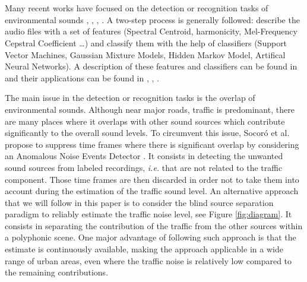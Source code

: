 \documentclass[twocolumn]{svjour3}          %
\providecommand{\DIFaddtex}[1]{{\protect\color{blue}\uwave{#1}}} %
\providecommand{\DIFaddend}{} %
\providecommand{\DIFadd}[1]{\texorpdfstring{\DIFaddtex{#1}}{#1}} %
\begin{document}
\section{\DIFadd{Related works}}
\DIFaddend Many recent works have focused on the detection or recognition tasks of environmental sounds \cite{heittola_sound_2011}, \cite{defreville_automatic_2006}, \cite{dufaux_automatic_2000}, \cite{chu_environmental_2009}. A two-step process is generally followed: describe the audio files with a set of features (Spectral Centroid, harmonicity, Mel-Frequency Cepstral Coefficient \dots) and classify them with the help of classifiers (Support Vector Machines, Gaussian Mixture Models, Hidden Markov Model, Artifical Neural Networks). A description of these features and classifiers can be found in \cite{cowling_comparison_2003} and their applications can be found in \cite{shen_environmental_2012}, \cite{beritelli_pattern_2008}, \cite{couvreur_automatic_2004}.


The main issue in the detection or recognition tasks is the overlap of environmental sounds. Although near major roads, traffic is predominant, there are many places where it overlaps with other sound sources which contribute significantly to the overall sound levels. To circumvent this issue, Socor\'o et al. propose to suppress time frames where there is significant overlap by considering an Anomalous Noise Events Detector \cite{socoro_anomalous_2017}. It consists in detecting the unwanted sound sources from labeled recordings, \textit{i.e.} that are not related to the traffic component. Those time frames are then discarded in order not to take them into account during the estimation of the traffic sound level.
An alternative approach that we will follow in this paper is to consider the blind source separation paradigm to reliably estimate the traffic noise level, see Figure \ref{fig:diagram}. It consists in separating the contribution of the traffic from the other sources within a polyphonic scene. One major advantage of following such approach is that the estimate is continuously available, making the approach applicable in a wide range of urban areas, even where the traffic noise is relatively low compared to the remaining contributions.\\
\end{document}
